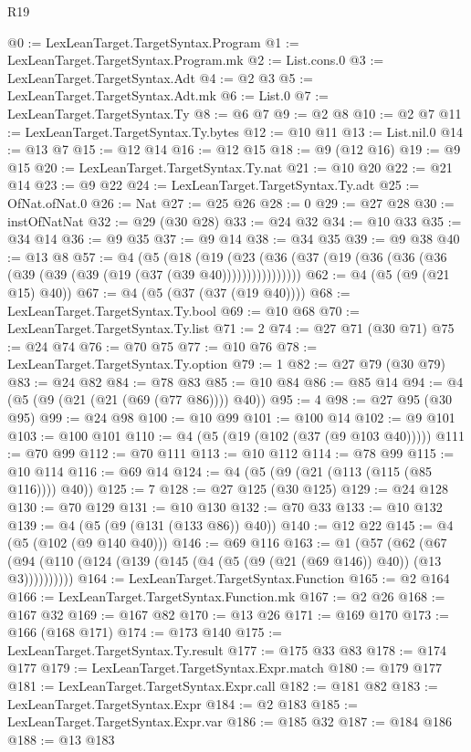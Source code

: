 \begin{lexlean}{R19}
\begin{coremodule}
@0 := LexLeanTarget.TargetSyntax.Program
@1 := LexLeanTarget.TargetSyntax.Program.mk
@2 := List.cons.{0}
@3 := LexLeanTarget.TargetSyntax.Adt
@4 := @2 @3
@5 := LexLeanTarget.TargetSyntax.Adt.mk
@6 := List.{0}
@7 := LexLeanTarget.TargetSyntax.Ty
@8 := @6 @7
@9 := @2 @8
@10 := @2 @7
@11 := LexLeanTarget.TargetSyntax.Ty.bytes
@12 := @10 @11
@13 := List.nil.{0}
@14 := @13 @7
@15 := @12 @14
@16 := @12 @15
@18 := @9 (@12 @16)
@19 := @9 @15
@20 := LexLeanTarget.TargetSyntax.Ty.nat
@21 := @10 @20
@22 := @21 @14
@23 := @9 @22
@24 := LexLeanTarget.TargetSyntax.Ty.adt
@25 := OfNat.ofNat.{0}
@26 := Nat
@27 := @25 @26
@28 := 0
@29 := @27 @28
@30 := instOfNatNat
@32 := @29 (@30 @28)
@33 := @24 @32
@34 := @10 @33
@35 := @34 @14
@36 := @9 @35
@37 := @9 @14
@38 := @34 @35
@39 := @9 @38
@40 := @13 @8
@57 := @4
    (@5
      (@18 (@19 (@23 (@36 (@37 (@19 (@36 (@36 (@36 (@39 (@39 (@39 (@19 (@37 (@39 @40))))))))))))))))
@62 := @4 (@5 (@9 (@21 @15) @40))
@67 := @4 (@5 (@37 (@37 (@19 @40))))
@68 := LexLeanTarget.TargetSyntax.Ty.bool
@69 := @10 @68
@70 := LexLeanTarget.TargetSyntax.Ty.list
@71 := 2
@74 := @27 @71 (@30 @71)
@75 := @24 @74
@76 := @70 @75
@77 := @10 @76
@78 := LexLeanTarget.TargetSyntax.Ty.option
@79 := 1
@82 := @27 @79 (@30 @79)
@83 := @24 @82
@84 := @78 @83
@85 := @10 @84
@86 := @85 @14
@94 := @4 (@5 (@9 (@21 (@21 (@69 (@77 @86)))) @40))
@95 := 4
@98 := @27 @95 (@30 @95)
@99 := @24 @98
@100 := @10 @99
@101 := @100 @14
@102 := @9 @101
@103 := @100 @101
@110 := @4 (@5 (@19 (@102 (@37 (@9 @103 @40)))))
@111 := @70 @99
@112 := @70 @111
@113 := @10 @112
@114 := @78 @99
@115 := @10 @114
@116 := @69 @14
@124 := @4 (@5 (@9 (@21 (@113 (@115 (@85 @116)))) @40))
@125 := 7
@128 := @27 @125 (@30 @125)
@129 := @24 @128
@130 := @70 @129
@131 := @10 @130
@132 := @70 @33
@133 := @10 @132
@139 := @4 (@5 (@9 (@131 (@133 @86)) @40))
@140 := @12 @22
@145 := @4 (@5 (@102 (@9 @140 @40)))
@146 := @69 @116
@163 := @1
    (@57 (@62 (@67 (@94 (@110 (@124 (@139 (@145 (@4 (@5 (@9 (@21 (@69 @146)) @40)) (@13 @3))))))))))
@164 := LexLeanTarget.TargetSyntax.Function
@165 := @2 @164
@166 := LexLeanTarget.TargetSyntax.Function.mk
@167 := @2 @26
@168 := @167 @32
@169 := @167 @82
@170 := @13 @26
@171 := @169 @170
@173 := @166 (@168 @171)
@174 := @173 @140
@175 := LexLeanTarget.TargetSyntax.Ty.result
@177 := @175 @33 @83
@178 := @174 @177
@179 := LexLeanTarget.TargetSyntax.Expr.match
@180 := @179 @177
@181 := LexLeanTarget.TargetSyntax.Expr.call
@182 := @181 @82
@183 := LexLeanTarget.TargetSyntax.Expr
@184 := @2 @183
@185 := LexLeanTarget.TargetSyntax.Expr.var
@186 := @185 @32
@187 := @184 @186
@188 := @13 @183

\end{coremodule}
\end{lexlean}
